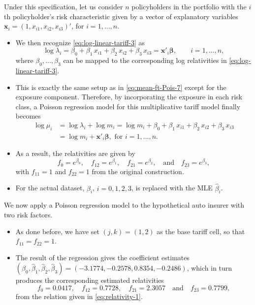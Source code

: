 \documentclass[ignorenonframetext,]{beamer}
\begin{document}
\begin{frame}[allowframebreaks]
\framebreak

Under this specification, let us consider $n$ policyholders in the portfolio with the $i$th policyholder's risk characteristic given by  a vector of explanatory variables $\mathbf{ x}_i=(1, x_{i1}, x_{i2},x_{i3})'$, for $i=1, \ldots, n$. 
\begin{itemize}
\item We then recognize \eqref{eq:log-linear-tariff-3} as 
$$
\log \lambda_{i}= \beta_0+ \beta_1 \, x_{i1} + \beta_{2} \, x_{i2} +\beta_3  \, x_{i3}=\mathbf{ x}'_i \boldsymbol \beta, \qquad i=1, \ldots, n,
$$
where $\beta_0, \ldots, \beta_3$ can be mapped to the corresponding log relativities in \eqref{eq:log-linear-tariff-3}. 
\framebreak 
\item This is exactly the same setup as in \eqref{eq:mean-ft-Pois-7} except for the exposure component. Therefore, by incorporating the exposure in each risk class, a Poisson regression model for this multiplicative tariff model finally becomes 
$$
\begin{array}{ll}
\log \mu_i &=\log \lambda_{i}+\log m_i= \log m_i+ \beta_0+ \beta_1 \, x_{i1} + \beta_{2} \, x_{i2} +\beta_3  \, x_{i3}\\
&=\log m_i+\mathbf{ x}'_i \boldsymbol \beta, \text{ for } i=1, \ldots, n.
\end{array}
$$
\item As a result, the relativities are given by
\begin{equation}
{f}_0=e^{\beta_0}, \quad {f}_{12}=e^{\beta_1}, \quad {f}_{21}=e^{\beta_2}, \quad \text{and}\quad {f}_{23}=e^{\beta_3},
\label{eq:relativity-1}
\end{equation}
with $f_{11}=1$ and $f_{22}=1$ from the original construction. 
\item For the actual dataset, $\beta_i$, $i=0,1, 2, 3$, is replaced with the MLE $\hat{\beta}_i$.  
\end{itemize}


\framebreak

We now apply a Poisson regression model to the hypothetical auto insurer with two risk factors. 
\begin{itemize}
\item As done before, we have set $(j,k)=(1,2)$ as the base tariff cell, so that  $f_{11}=f_{22}=1$.
\item  The result of the regression gives the coefficient estimates $(\hat{\beta}_0, \hat{\beta}_1,\hat{\beta}_2,\hat{\beta}_3)=(-3.1774,   -0.2578,    0.8354,  -0.2486)$, which in turn produces the corresponding estimated relativities
$$
{f}_0= 0.0417, \quad {f}_{12}= 0.7728, \quad {f}_{21}=  2.3057  \quad \text{and}\quad {f}_{23}=  0.7799,
$$
from the relation given in \eqref{eq:relativity-1}.
\end{itemize}
\end{frame}
\end{document}
